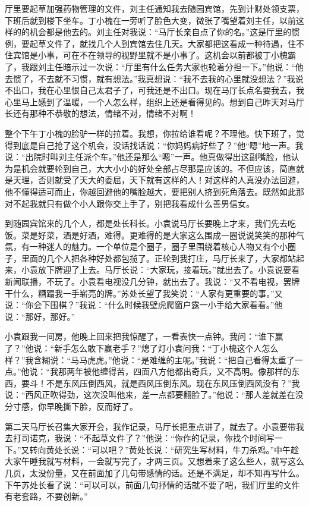 \documentclass[12pt,oneside]{book}
\begin{document}
厅里要起草加强药物管理的文件，刘主任通知我去随园宾馆，先到计财处领支票，下班后就到楼下坐车。丁小槐在一旁听了脸色大变，微张了嘴望着刘主任，以前这样的的机会都是他去的。刘主任对我说：``马厅长亲自点了你的名。''这是厅里的惯例，要起草文件了，就找几个人到宾馆去住几天。大家都把这看成一种待遇，住不住宾馆是小事，可在不在领导的视野里就不是小事了。这机会以前都被丁小槐霸了，我跟刘主任暗示过一次说：``厅里有什么任务大家也轮着分担一下。''他说：``他去惯了，不去就不习惯，就有想法。''我真想说：``我不去我的心里就没想法？''我说不出口，我在心里恨自己太君子了，可我还是不出口。现在马厅长点名要我去，我心里马上感到了温暖，一个人怎么样，组织上还是看得见的。想到自己昨天对马厅长还有那种不恭敬的想法，情绪不对，情绪不对啊！

整个下午丁小槐的脸驴一样的拉着。我想，你拉给谁看呢？不理他。快下班了，觉得到底是自己抢了这个机会，没话找话说：``你妈妈病好些了？''他``嗯''地一声。我说：``出院时叫刘主任派个车。''他还是那么``嗯''一声。他真做得出这副嘴脸，他认为是机会就要轮到自己，大大小小的好处全部占尽那是应该的。不但应该，简直就是天理，否则就受了天大的委屈，天下就有这样的人！对这样的人真没办法回避，他不懂得适可而止，你越回避他的嘴脸越大，要把别人挤到死角落去。既然如此那对不起我就只有做个小人跟你交上手了，别把我看成什么善男信女。

到随园宾馆来的几个人，都是处长科长。小袁说马厅长要晚上才来，我们先去吃饭。菜是好菜，酒是好酒，难得。更难得的是大家这么围成一圈说说笑笑的那种气氛，有一种迷人的魅力。一个单位是个圈子，圈子里围绕着核心人物又有个小圈子，里面的几个人把各种好处都包揽了。正轮到我打庄，马厅长来了，大家都站起来，小袁放下牌迎了上去。马厅长说：``大家玩，接着玩。''就出去了。小袁说要看新闻联播，不玩了。小袁看电视没几分钟，就出去了。我说：``又不看电视，罢牌干什么，糟蹋我一手崭亮的牌。''苏处长望了我笑说：``人家有更重要的事。''又说：``你会下围棋？''我说：``什么时候我壁虎爬窗户露一小手给大家看看。''他说：``那好，那好。''

小袁跟我一间房，他晚上回来把我惊醒了，一看表快一点钟。我问：``谁下赢了？''他说：``新手怎么敢下赢老手？''熄了灯小袁问我：``丁小槐这个人怎么样？''我含糊说：``马马虎虎。''他说：``是难缠的主呢。''我说：``把自己看得太重了一点。''他说：``我那两年被他缠得苦，四面八方他都出奇兵，又不高明。像那样的东西，要斗！不是东风压倒西风，就是西风压倒东风。现在东风压倒西风没有？''我说：``西风正吹得劲，这次没叫他来，差一点都要翻脸了。''他说：``那人差就差在没分寸感，你早晚撕下脸，反而好了。

第二天马厅长召集大家开会，我作记录，马厅长把重点讲了，就去了。小袁要带我去打司诺克，我说：``不起草文件了？''他说：``你作的记录，你找个时间写一下。''又转向黄处长说：``可以吧？''黄处长说：``研究生写材料，牛刀杀鸡。''中午趁大家午睡我就写材料，一会就写完了，才两三页。又想着来了这么些人，就写这么几页，太没份量，又在前面加了几句带感情的话。还是不满足，却不知再写什么。下午苏处长看了说：``可以可以，前面几句抒情的话就不要了吧，我们厅里的文件有老套路，不要创新。''
\end{document}
